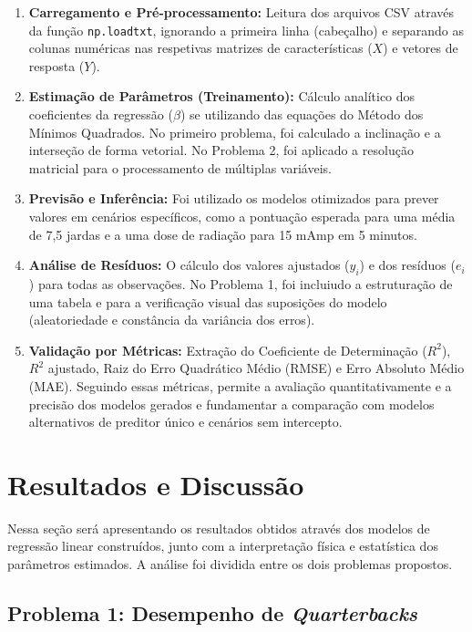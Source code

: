 \documentclass{article}
\begin{document}
\begin{enumerate}
    \item \textbf{Carregamento e Pré-processamento:} Leitura dos arquivos CSV através da função \texttt{np.loadtxt}, ignorando a primeira linha (cabeçalho) e separando as colunas numéricas nas respetivas matrizes de características ($X$) e vetores de resposta ($Y$).
    \item \textbf{Estimação de Parâmetros (Treinamento):} Cálculo analítico dos coeficientes da regressão ($\beta$) se utilizando das equações do Método dos Mínimos Quadrados. No primeiro problema, foi calculado a inclinação e a interseção de forma vetorial. No Problema 2, foi aplicado a resolução matricial para o processamento de múltiplas variáveis.
    \item \textbf{Previsão e Inferência:} Foi utilizado os modelos otimizados para prever valores em cenários específicos, como a pontuação esperada para uma média de 7,5 jardas e a uma dose de radiação para 15 mAmp em 5 minutos.
    \item \textbf{Análise de Resíduos:} O cálculo dos valores ajustados ($\hat{y}_i$) e dos resíduos ($e_i$) para todas as observações. No Problema 1, foi incluiudo a estruturação de uma tabela e para a verificação visual das suposições do modelo (aleatoriedade e constância da variância dos erros).
    \item \textbf{Validação por Métricas:} Extração do Coeficiente de Determinação ($R^2$), $R^2$ ajustado, Raiz do Erro Quadrático Médio (RMSE) e Erro Absoluto Médio (MAE). Seguindo essas métricas, permite a avaliação quantitativamente e a precisão dos modelos gerados e fundamentar a comparação com modelos alternativos de preditor único e cenários sem intercepto.
\end{enumerate}

\section{Resultados e Discussão}
Nessa seção será apresentando os resultados obtidos através dos modelos de regressão linear construídos, junto com a interpretação física e estatística dos parâmetros estimados. A análise foi dividida entre os dois problemas propostos.

\subsection{Problema 1: Desempenho de \textit{Quarterbacks}}
\end{document}
